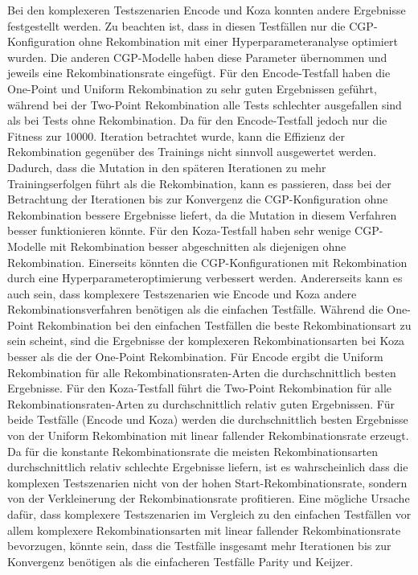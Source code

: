 Bei den komplexeren Testszenarien Encode und Koza konnten andere Ergebnisse festgestellt werden.
Zu beachten ist, dass in diesen Testfällen nur die CGP-Konfiguration ohne Rekombination mit einer Hyperparameteranalyse optimiert wurden.
Die anderen CGP-Modelle haben diese Parameter übernommen und jeweils eine Rekombinationsrate eingefügt.
Für den Encode-Testfall haben die One-Point und Uniform Rekombination zu sehr guten Ergebnissen geführt, während bei der Two-Point Rekombination alle Tests schlechter ausgefallen sind als bei Tests ohne Rekombination.
Da für den Encode-Testfall jedoch nur die Fitness zur 10000. Iteration betrachtet wurde, kann die Effizienz der Rekombination gegenüber des Trainings nicht sinnvoll ausgewertet werden.
Dadurch, dass die Mutation in den späteren Iterationen zu mehr Trainingserfolgen führt als die Rekombination, kann es passieren, dass bei der Betrachtung der Iterationen bis zur Konvergenz die CGP-Konfiguration ohne Rekombination bessere Ergebnisse liefert, da die Mutation in diesem Verfahren besser funktionieren könnte.
Für den Koza-Testfall haben sehr wenige CGP-Modelle mit Rekombination besser abgeschnitten als diejenigen ohne Rekombination.
Einerseits könnten die CGP-Konfigurationen mit Rekombination durch eine Hyperparameteroptimierung verbessert werden.
Andererseits kann es auch sein, dass komplexere Testszenarien wie Encode und Koza andere Rekombinationsverfahren benötigen als die einfachen Testfälle.
Während die One-Point Rekombination bei den einfachen Testfällen die beste Rekombinationsart zu sein scheint, sind die Ergebnisse der komplexeren Rekombinationsarten bei Koza besser als die der One-Point Rekombination.
Für Encode ergibt die Uniform Rekombination für alle Rekombinationsraten-Arten die durchschnittlich besten Ergebnisse.
Für den Koza-Testfall führt die Two-Point Rekombination für alle Rekombinationsraten-Arten zu durchschnittlich relativ guten Ergebnissen.
Für beide Testfälle (Encode und Koza) werden die durchschnittlich besten Ergebnisse von der Uniform Rekombination mit linear fallender Rekombinationsrate erzeugt.
Da für die konstante Rekombinationsrate die meisten Rekombinationsarten durchschnittlich relativ schlechte Ergebnisse liefern, ist es wahrscheinlich dass die komplexen Testszenarien nicht von der hohen Start-Rekombinationsrate, sondern von der Verkleinerung der Rekombinationsrate profitieren.
Eine mögliche Ursache dafür, dass komplexere Testszenarien im Vergleich zu den einfachen Testfällen vor allem komplexere Rekombinationsarten mit linear fallender Rekombinationsrate bevorzugen, könnte sein, dass die Testfälle insgesamt mehr Iterationen bis zur Konvergenz benötigen als die einfacheren Testfälle Parity und Keijzer.
